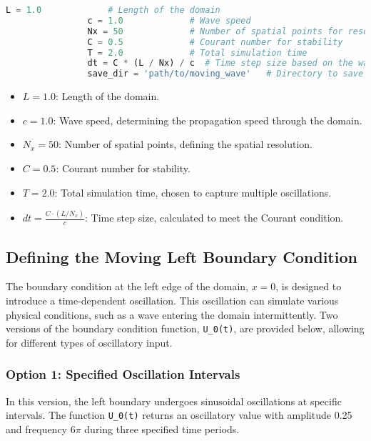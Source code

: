 \documentclass{article}
\begin{document}
			\begin{lstlisting}[language=Python]
				L = 1.0             # Length of the domain
				c = 1.0             # Wave speed
				Nx = 50             # Number of spatial points for resolution
				C = 0.5             # Courant number for stability
				T = 2.0             # Total simulation time
				dt = C * (L / Nx) / c  # Time step size based on the wave speed and Courant number
				save_dir = 'path/to/moving_wave'   # Directory to save images
			\end{lstlisting}
			
			\begin{itemize}
				\item \( L = 1.0 \): Length of the domain.
				\item \( c = 1.0 \): Wave speed, determining the propagation speed through the domain.
				\item \( N_x = 50 \): Number of spatial points, defining the spatial resolution.
				\item \( C = 0.5 \): Courant number for stability.
				\item \( T = 2.0 \): Total simulation time, chosen to capture multiple oscillations.
				\item \( dt = \frac{C \cdot (L / N_x)}{c} \): Time step size, calculated to meet the Courant condition.
			\end{itemize}
			
			\subsection{Defining the Moving Left Boundary Condition}
			
			The boundary condition at the left edge of the domain, \( x = 0 \), is designed to introduce a time-dependent oscillation. This oscillation can simulate various physical conditions, such as a wave entering the domain intermittently. Two versions of the boundary condition function, \texttt{U\_0(t)}, are provided below, allowing for different types of oscillatory input.
			
			\subsubsection{Option 1: Specified Oscillation Intervals}
			
			In this version, the left boundary undergoes sinusoidal oscillations at specific intervals. The function \texttt{U\_0(t)} returns an oscillatory value with amplitude 0.25 and frequency \(6 \pi\) during three specified time periods.
			
\end{document}
